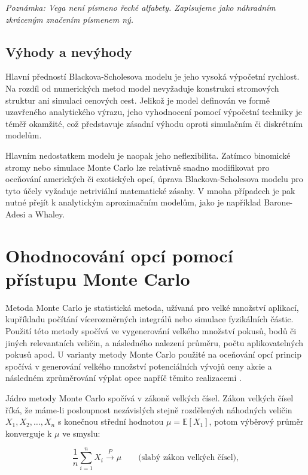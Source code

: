 \documentclass[male,czech,api_bc]{kitheses}
\begin{document}
  \textit{Poznámka: Vega není písmeno řecké alfabety. Zapisujeme jako náhradním zkráceným značením písmenem ný.}

  \subsection{Výhody a nevýhody}

  Hlavní předností Blackova-Scholesova modelu je jeho vysoká výpočetní rychlost. Na rozdíl od numerických metod model nevyžaduje konstrukci stromových struktur ani simulaci cenových cest. Jelikož je model definován ve formě uzavřeného analytického výrazu, jeho vyhodnocení pomocí výpočetní techniky je téměř okamžité, což představuje zásadní výhodu oproti simulačním či diskrétním modelům.

  Hlavním nedostatkem modelu je naopak jeho neflexibilita. Zatímco binomické stromy nebo simulace Monte Carlo lze relativně snadno modifikovat pro oceňování amerických či exotických opcí, úprava Blackova-Scholesova modelu pro tyto účely vyžaduje netriviální matematické zásahy. V mnoha případech je pak nutné přejít k analytickým aproximačním modelům, jako je například Barone-Adesi a Whaley.

  \section{Ohodnocování opcí pomocí přístupu Monte Carlo}

  Metoda Monte Carlo je statistická metoda, užívaná pro velké množství aplikací, kupříkladu počítání vícerozměrných integrálů nebo simulace fyzikálních částic. Použití této metody spočívá ve vygenerování velkého množství pokusů, bodů či jiných relevantních veličin, a následného nalezení průměru, počtu aplikovatelných pokusů apod. U varianty metody Monte Carlo použité na oceňování opcí princip spočívá v generování velkého množství potenciálních vývojů ceny akcie a následném zprůměrování výplat opce napříč těmito realizacemi \parencites[kapitola~1.1]{Glasserman2004}.

  Jádro metody Monte Carlo spočívá v zákoně velkých čísel. Zákon velkých čísel říká, že máme-li posloupnost nezávislých stejně rozdělených náhodných veličin $X_1, X_2, \dots, X_n$ s konečnou střední hodnotou $\mu = \mathbb{E}[X_1]$, potom výběrový průměr konverguje k $\mu$ ve smyslu:

  \begin{equation}
    \label{eq:weak_big_numbers}
    \frac{1}{n}\sum_{i=1}^n X_i \xrightarrow{P} \mu \qquad\text{(slabý zákon velkých čísel)},
  \end{equation}
\end{document}
